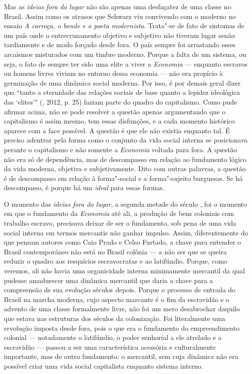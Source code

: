 Mas as \emph{ideias} \emph{fora} \emph{do} \emph{lugar} não são apenas
uma desfaçatez de uma classe no Brasil. Assim como os atrasos que
Schwarz viu convivendo com o moderno no ensaio \emph{A carroça, o bonde
e o poeta modernista}. Trata"-se de fato de sintomas de um país onde o
entrecruzamento objetivo e subjetivo não tiveram lugar senão tardiamente
e de modo forçado desde fora. O país sempre foi arrastando esses arcaísmos
misturados com um timbre moderno. Porque a falta de um sistema, ou seja,
o fato de sempre ter sido uma elite a viver a \emph{Economia} ---
enquanto escravos ou homens livres viviam no entorno dessa economia ---
não era propício à germinação de uma dinâmica social moderna. Por isso,
é por demais geral dizer que ``tanto a eternidade das relações sociais
de base quanto a lepidez ideológica das `elites'" (, 2012, p.
25) faziam parte do quadro do capitalismo. Como pude afirmar acima, não se
pode resolver a questão apenas argumentando que o capitalismo é assim
mesmo, tem essas disfunções, e a cada momento histórico aparece com a
face possível. A questão é que ele não existia enquanto tal. É
preciso adentrar pela forma como o conjunto da vida social interna
se posicionava perante o capitalismo e não somente a \emph{Economia}
voltada para fora. A questão não era só de dependência, mas de
descompasso em relação ao fundamento lógico da vida moderna, objetiva e
subjetivamente. Dito com outras palavras, a questão é de descompasso em
relação à forma"-social e a forma"-sujeito burguesas. Se há descompasso, é
porque há um \emph{ideal} para essas formas.

O momento das \emph{ideias fora do lugar}, a segunda metade do século
, foi o momento em que o fundamento da \emph{Economia} até ali, a
produção de bens coloniais com trabalho escravo, precisava deixar de ser
o fundamento, sob pena de uma vida social interna em termos mercantis
não ganhar impulso. Assim, diferentemente do que pensam autores como
Caio Prado e Celso Furtado, a chave para entender o Brasil contemporâneo
não está no Brasil colônia --- a não ser que se queira reduzir o quadro
aos resquícios escravocratas e ao latifúndio. Porque, como veremos, ali
não havia uma organicidade interna minimamente mercantil da qual pudesse
amadurecer uma dinâmica mercantil que daria a chave para a compreensão
de sua evolução séculos depois. Porque o processo de entrada do Brasil
na marcha moderna, cujo aspecto marcante é o fim da escravidão e o
advento de uma classe formalmente livre, não foi um mero desabrochar
daquilo que estava nas estruturas dos séculos da colonização. Foi
literalmente uma revolução imposta desde fora, pois o que era o fundamento do
empreendimento colonial --- notadamente o latifúndio, o poder senhorial a
ele atrelado e a escravidão --- passou a ser uma característica acessória
e culturalmente importante, mas de outro fundamento: o mercantil, sem
cuja dinâmica não era possível criar uma vida social capitalista
enquanto sistema interno.

